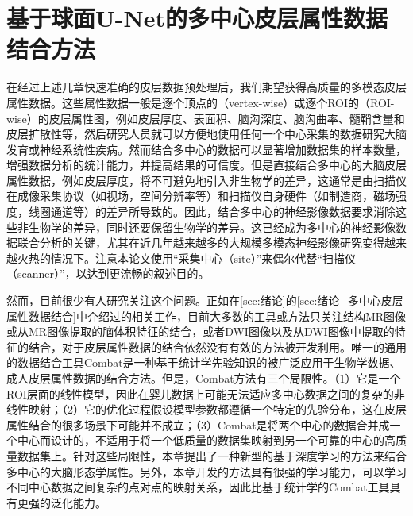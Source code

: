


\chapter{基于球面U-Net的多中心皮层属性数据结合方法}\label{sec:基于球面U-Net的多中心皮层属性数据结合方法}


在经过上述几章快速准确的皮层数据预处理后，我们期望获得高质量的多模态皮层属性数据。这些属性数据一般是逐个顶点的（vertex-wise）或逐个ROI的（ROI-wise）的皮层属性图，例如皮层厚度、表面积、脑沟深度、脑沟曲率、髓鞘含量和皮层扩散性等，然后研究人员就可以方便地使用任何一个中心采集的数据研究大脑发育或神经系统性疾病。然而结合多中心的数据可以显著增加数据集的样本数量，增强数据分析的统计能力，并提高结果的可信度。但是直接结合多中心的大脑皮层属性数据，例如皮层厚度，将不可避免地引入非生物学的差异，这通常是由扫描仪在成像采集协议（如视场，空间分辨率等）和扫描仪自身硬件（如制造商，磁场强度，线圈通道等）的差异所导致的。因此，结合多中心的神经影像数据要求消除这些非生物学的差异，同时还要保留生物学的差异。这已经成为多中心的神经影像数据联合分析的关键，尤其在近几年越来越多的大规模多模态神经影像研究变得越来越火热的情况下。注意本论文使用“采集中心（site）”来偶尔代替“扫描仪（scanner）”，以达到更流畅的叙述目的。

然而，目前很少有人研究关注这个问题。正如在\ref{sec:绪论}的\ref{sec:绪论_多中心皮层属性数据结合}中介绍过的相关工作，目前大多数的工具或方法只关注结构MR图像或从MR图像提取的脑体积特征的结合\cite{pomponio2020harmonization}，或者DWI图像以及从DWI图像中提取的特征的结合\cite{karayumak2019retrospective}，对于皮层属性数据的结合依然没有有效的方法被开发利用。唯一的通用的数据结合工具Combat\cite{fortin2018harmonization}是一种基于统计学先验知识的被广泛应用于生物学数据、成人皮层属性数据的结合方法。但是，Combat方法有三个局限性。（1）它是一个ROI层面的线性模型，因此在婴儿数据上可能无法适应多中心数据之间的复杂的非线性映射；（2）它的优化过程假设模型参数都遵循一个特定的先验分布，这在皮层属性结合的很多场景下可能并不成立；（3）Combat是将两个中心的数据合并成一个中心而设计的，不适用于将一个低质量的数据集映射到另一个可靠的中心的高质量数据集上。针对这些局限性，本章提出了一种新型的基于深度学习的方法来结合多中心的大脑形态学属性。另外，本章开发的方法具有很强的学习能力，可以学习不同中心数据之间复杂的点对点的映射关系，因此比基于统计学的Combat工具具有更强的泛化能力。

